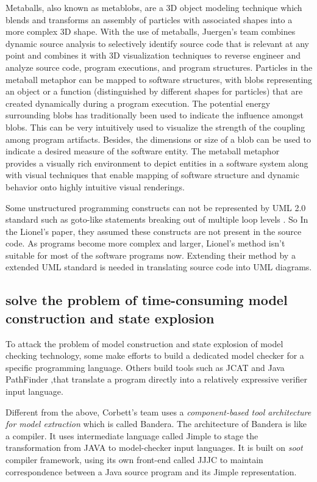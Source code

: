 \documentclass[acmsmall]{acmart}
\begin{document}
Metaballs, also known as metablobs, are a 3D object modeling technique which blends and transforms an assembly of particles with associated shapes into a more complex 3D shape. With the use of metaballs,  Juergen's team combines dynamic source analysis to selectively identify source code that is relevant at any point and combines it with 3D visualization techniques to reverse engineer and analyze source code, program executions, and program structures. Particles in the metaball metaphor can be mapped to software structures, with blobs representing an object or a function (distinguished by different shapes for particles) that are created dynamically during a program execution. The potential energy surrounding blobs has traditionally been used to indicate the influence amongst blobs. This can be very intuitively used to visualize the strength of the coupling among program artifacts. Besides, the dimensions or size of a blob can be used to indicate a desired measure of the software entity. The metaball metaphor provides a visually rich environment to depict entities in a software system along with visual techniques that enable mapping of software structure and dynamic behavior onto highly intuitive visual renderings. 


Some unstructured programming constructs can not be represented by UML 2.0 standard such as goto-like statements breaking out of multiple loop levels \cite{2006Toward}. So In the Lionel's paper, they assumed these constructs are not present in the source code. As programs become more complex and larger, Lionel's method isn't suitable for most of the software programs now. Extending their method by a extended UML standard is needed in translating source code into UML diagrams.

\subsection{solve the problem of time-consuming model construction and state explosion}


To attack the problem of model construction and state explosion of model checking technology, some make efforts to build a dedicated model checker for a specific programming language\cite{huch1999verification}. Others build tools such as JCAT \cite{demartini1999deadlock} 
and Java PathFinder \cite{havelund2000model},that translate a program directly into a relatively expressive verifier input language. 


Different from the above, Corbett's team uses a {\itshape component-based tool architecture for model extraction} which is called Bandera. The architecture of Bandera is like a compiler. It uses intermediate language called Jimple to stage the transformation from JAVA to model-checker input languages. It is built on {\itshape soot} compiler framework, using its own front-end called JJJC to maintain correspondence between a Java source program and its Jimple representation. 
\end{document}
